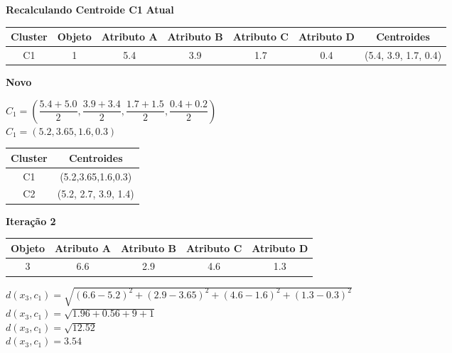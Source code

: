 \documentclass{article}
\begin{document}
  \textbf{Recalculando Centroide C1}
  \newline
  \textbf{Atual}
  \begin{table}[H]
    \centering
    \begin{tabular}{|c|c|c|c|c|c|c|}
    \hline
    \rowcolor[HTML]{EFEFEF} 
    \textbf{Cluster} & \textbf{Objeto} & \textbf{Atributo A} & \textbf{Atributo B} & \textbf{Atributo C} & \textbf{Atributo D} & \textbf{Centroides}  \\ \hline
    C1               & 1               & 5.4                 & 3.9                 & 1.7                 & 0.4                 & (5.4, 3.9, 1.7, 0.4) \\ \hline
    \end{tabular}
  \end{table}
  \textbf{Novo}
  \begin{center}
    $C_1 = (\dfrac{5.4+5.0}{2}, \dfrac{3.9+3.4}{2}, \dfrac{1.7+1.5}{2}, \dfrac{0.4+0.2}{2})$ \\
    $C_1 = (5.2, 3.65, 1.6, 0.3)$

    \begin{table}[H]
      \centering
      \begin{tabular}{|c|c|}
      \hline
      \rowcolor[HTML]{EFEFEF} 
      \textbf{Cluster} & \textbf{Centroides}  \\ \hline
      C1               & (5.2,3.65,1.6,0.3)   \\ \hline
      C2               & (5.2, 2.7, 3.9, 1.4) \\ \hline
      \end{tabular}
    \end{table}
  \end{center}


  \textbf{Iteração 2}

  \begin{table}[H]
    \centering
    \begin{tabular}{|c|c|c|c|c|}
    \hline
    \rowcolor[HTML]{EFEFEF} 
    \textbf{Objeto} & \textbf{Atributo A} & \textbf{Atributo B} & \textbf{Atributo C} & \textbf{Atributo D} \\ \hline
    3               & 6.6                 & 2.9                 & 4.6                 & 1.3                 \\ \hline
    \end{tabular}
  \end{table}

  \begin{center}
    $d(x_3,c_1) = \sqrt{(6.6-5.2)^2 + (2.9-3.65)^2 + (4.6-1.6)^2 +(1.3-0.3)^2}$  \\
    $d(x_3,c_1) = \sqrt{1.96 + 0.56 + 9 + 1}$ \\
    $d(x_3,c_1) = \sqrt{12.52}$ \\
    $d(x_3,c_1) = 3.54$
  \end{center}
\end{document}
